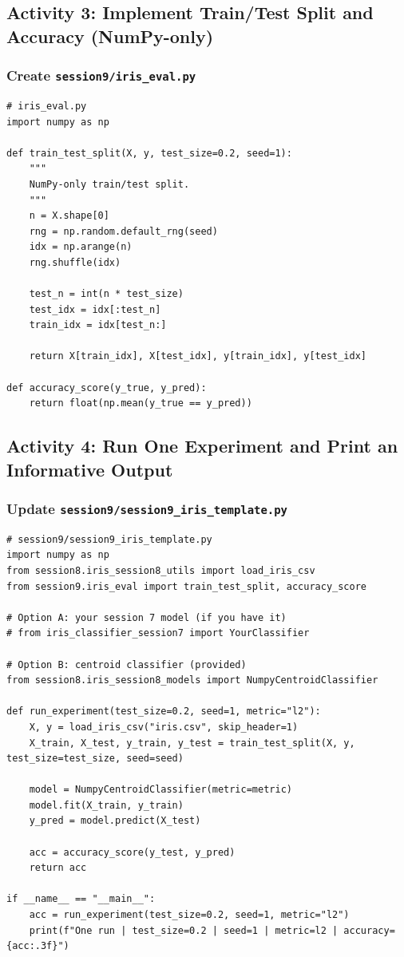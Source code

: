 \newpage
\subsection{Activity 3: Implement Train/Test Split and Accuracy (NumPy-only)}

\subsubsection{Create \texttt{session9/iris\_eval.py}}
\begin{verbatim}
# iris_eval.py
import numpy as np

def train_test_split(X, y, test_size=0.2, seed=1):
    """
    NumPy-only train/test split.
    """
    n = X.shape[0]
    rng = np.random.default_rng(seed)
    idx = np.arange(n)
    rng.shuffle(idx)

    test_n = int(n * test_size)
    test_idx = idx[:test_n]
    train_idx = idx[test_n:]

    return X[train_idx], X[test_idx], y[train_idx], y[test_idx]

def accuracy_score(y_true, y_pred):
    return float(np.mean(y_true == y_pred))
\end{verbatim}

\newpage
\subsection{Activity 4: Run One Experiment and Print an Informative Output}
\label{sec:activity4_one_run}

\subsubsection{Update \texttt{session9/session9\_iris\_template.py}}
\begin{verbatim}
# session9/session9_iris_template.py
import numpy as np
from session8.iris_session8_utils import load_iris_csv
from session9.iris_eval import train_test_split, accuracy_score

# Option A: your session 7 model (if you have it)
# from iris_classifier_session7 import YourClassifier

# Option B: centroid classifier (provided)
from session8.iris_session8_models import NumpyCentroidClassifier

def run_experiment(test_size=0.2, seed=1, metric="l2"):
    X, y = load_iris_csv("iris.csv", skip_header=1)
    X_train, X_test, y_train, y_test = train_test_split(X, y, test_size=test_size, seed=seed)

    model = NumpyCentroidClassifier(metric=metric)
    model.fit(X_train, y_train)
    y_pred = model.predict(X_test)

    acc = accuracy_score(y_test, y_pred)
    return acc

if __name__ == "__main__":
    acc = run_experiment(test_size=0.2, seed=1, metric="l2")
    print(f"One run | test_size=0.2 | seed=1 | metric=l2 | accuracy={acc:.3f}")
\end{verbatim}

